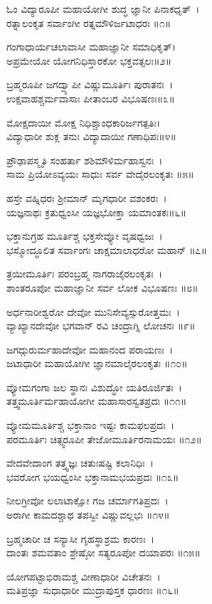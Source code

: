 ಓಂ ವಿದ್ಯಾರೂಪೀ ಮಹಾಯೋಗೀ ಶುದ್ಧ ಜ್ಞಾನೀ ಪಿನಾಕಧೃತ್~।\\
ರತ್ನಾಲಂಕೃತ ಸರ್ವಾಂಗೀ ರತ್ನಮೌಳಿರ್ಜಟಾಧರಃ ॥೧॥

ಗಂಗಾಧಾರ್ಯಚಲಾವಾಸೀ ಮಹಾಜ್ಞಾನೀ ಸಮಾಧಿಕೃತ್।\\
ಅಪ್ರಮೇಯೋ ಯೋಗನಿಧಿಸ್ತಾರಕೋ ಭಕ್ತವತ್ಸಲಃ॥೨॥

ಬ್ರಹ್ಮರೂಪೀ ಜಗದ್ವ್ಯಾಪೀ ವಿಷ್ಣುಮೂರ್ತಿಃ ಪುರಾತನಃ~।\\
ಉಕ್ಷವಾಹಶ್ಚರ್ಮವಾಸಾಃ ಪೀತಾಂಬರ ವಿಭೂಷಣಃ॥೩॥

ಮೋಕ್ಷದಾಯೀ ಮೋಕ್ಷ ನಿಧಿಶ್ಚಾಂಧಕಾರಿರ್ಜಗತ್ಪತಿಃ।\\
ವಿದ್ಯಾಧಾರೀ ಶುಕ್ಲ ತನುಃ ವಿದ್ಯಾದಾಯೀ ಗಣಾಧಿಪಃ॥೪॥

ಪ್ರೌಢಾಪಸ್ಮೃತಿ ಸಂಹರ್ತಾ ಶಶಿಮೌಳಿರ್ಮಹಾಸ್ವನಃ~।\\
ಸಾಮ ಪ್ರಿಯೋಽವ್ಯಯಃ ಸಾಧುಃ ಸರ್ವ ವೇದೈರಲಂಕೃತಃ ॥೫॥

ಹಸ್ತೇ ವಹ್ನಿಧರಃ ಶ್ರೀಮಾನ್ ಮೃಗಧಾರೀ ವಶಂಕರಃ~।\\
ಯಜ್ಞನಾಥಃ ಕ್ರತುಧ್ವಂಸೀ ಯಜ್ಞಭೋಕ್ತಾ ಯಮಾಂತಕಃ॥೬॥

ಭಕ್ತಾನುಗ್ರಹ ಮೂರ್ತಿಶ್ಚ ಭಕ್ತಸೇವ್ಯೋ ವೃಷಧ್ವಜಃ~।\\
ಭಸ್ಮೋದ್ಧೂಲಿತ ಸರ್ವಾಂಗಃ ಚಾಕ್ಷಮಾಲಾಧರೋ ಮಹಾನ್ ॥೭॥

ತ್ರಯೀಮೂರ್ತಿಃ ಪರಂಬ್ರಹ್ಮ ನಾಗರಾಜೈರಲಂಕೃತಃ~।\\
ಶಾಂತರೂಪೋ ಮಹಾಜ್ಞಾನೀ ಸರ್ವ ಲೋಕ ವಿಭೂಷಣಃ ॥೮॥

ಅರ್ಧನಾರೀಶ್ವರೋ ದೇವೋ ಮುನಿಸೇವ್ಯಸ್ಸುರೋತ್ತಮಃ~।\\
ವ್ಯಾಖ್ಯಾನದೇವೋ ಭಗವಾನ್ ರವಿ ಚಂದ್ರಾಗ್ನಿ ಲೋಚನಃ ॥೯॥

ಜಗದ್ಗುರುರ್ಮಹಾದೇವೋ ಮಹಾನಂದ ಪರಾಯಣಃ~।\\
ಜಟಾಧಾರೀ ಮಹಾಯೋಗೀ ಜ್ಞಾನಮಾಲೈರಲಂಕೃತಃ ॥೧೦॥

ವ್ಯೋಮಗಂಗಾ ಜಲ ಸ್ಥಾನಃ ವಿಶುದ್ಧೋ ಯತಿರೂರ್ಜಿತಃ~।\\
ತತ್ತ್ವಮೂರ್ತಿರ್ಮಹಾಯೋಗೀ ಮಹಾಸಾರಸ್ವತಪ್ರದಃ ॥೧೧॥

ವ್ಯೋಮಮೂರ್ತಿಶ್ಚ ಭಕ್ತಾನಾಂ ಇಷ್ಟಃ ಕಾಮಫಲಪ್ರದಃ~।\\
ಪರಮೂರ್ತಿಃ ಚಿತ್ಸ್ವರೂಪೀ ತೇಜೋಮೂರ್ತಿರನಾಮಯಃ ॥೧೨॥

ವೇದವೇದಾಂಗ ತತ್ತ್ವಜ್ಞಃ ಚತುಃಷಷ್ಟಿ ಕಲಾನಿಧಿಃ~।\\
ಭವರೋಗ ಭಯಧ್ವಂಸೀ ಭಕ್ತಾನಾಮಭಯಪ್ರದಃ ॥೧೩॥

ನೀಲಗ್ರೀವೋ ಲಲಾಟಾಕ್ಷೋ ಗಜ ಚರ್ಮಾಗತಿಪ್ರದಃ~।\\
ಅರಾಗೀ ಕಾಮದಶ್ಚಾಥ ತಪಸ್ವೀ ವಿಷ್ಣುವಲ್ಲಭಃ ॥೧೪॥

ಬ್ರಹ್ಮಚಾರೀ ಚ ಸನ್ಯಾಸೀ ಗೃಹಸ್ಥಾಶ್ರಮ ಕಾರಣಃ~।\\
ದಾಂತಃ ಶಮವತಾಂ ಶ್ರೇಷ್ಠೋ ಸತ್ಯರೂಪೋ ದಯಾಪರಃ ॥೧೫॥

ಯೋಗಪಟ್ಟಾಭಿರಾಮಶ್ಚ ವೀಣಾಧಾರೀ ವಿಚೇತನಃ~।\\
ಮತಿಪ್ರಜ್ಞಾ ಸುಧಾಧಾರೀ ಮುದ್ರಾಪುಸ್ತಕ ಧಾರಣಃ ॥೧೬॥


